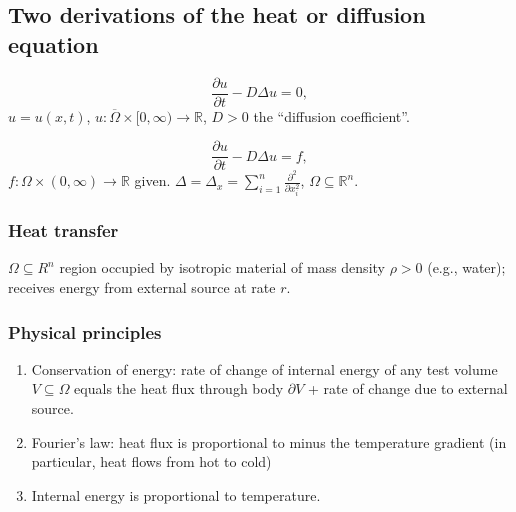 \documentclass[12pt]{article}
\theoremstyle{definition}
\begin{document}

\subsection{Two derivations of the heat or diffusion equation}
\begin{equation}\tag{H}
\frac{\partial u}{\partial t}-D\Delta u=0,
\end{equation}
$u=u(x,t)$, $u:\overline{\Omega}\times[0,\infty)\rightarrow\mathbb{R}$, $D>0$ the ``diffusion coefficient''.

\begin{equation}\tag{IH}
\frac{\partial u}{\partial t}-D\Delta u=f,
\end{equation}
$f:\Omega\times(0,\infty)\rightarrow\mathbb{R}$ given. $\Delta=\Delta_x=\sum_{i=1}^n\frac{\partial^2}{\partial x_i^2}$, $\Omega\subseteq\mathbb{R}^n$.

\subsubsection*{Heat transfer}

$\Omega\subseteq R^n$ region occupied by isotropic material of mass density $\rho>0$ (e.g., water); receives energy from external source at rate $r$.

\subsubsection*{Physical principles}

\begin{enumerate}[label=(\arabic*)]
\item\label{conservation_energy} Conservation of energy: rate of change of internal energy of any test volume $V\subseteq\Omega$ equals the heat flux through body $\partial V$ + rate of change due to external source.

\item Fourier's law: heat flux is proportional to minus the temperature gradient (in particular, heat flows from hot to cold)

\item Internal energy is proportional to temperature.
\end{enumerate}
\end{document}
